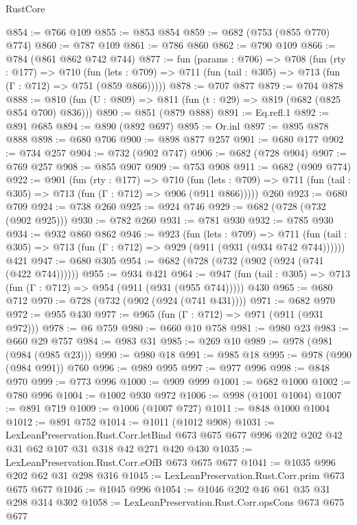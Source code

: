 \begin{lexlean}{RustCore}
\begin{coremodule}
@854 := @766 @109
@855 := @853 @854
@859 := @682 (@753 (@855 @770) @774)
@860 := @787 @109
@861 := @786 @860
@862 := @790 @109
@866 := @784 (@861 @862 @742 @744)
@877 := fun (params : @706) =>
  @708
    (fun (rty : @177) =>
    @710
      (fun (lets : @709) => @711 (fun (tail : @305) => @713 (fun (Γ : @712) => @751 (@859 @866)))))
@878 := @707 @877
@879 := @704 @878
@888 := @810 (fun (U : @809) => @811 (fun (t : @29) => @819 (@682 (@825 @854 @700) @836)))
@890 := @851 (@879 @888)
@891 := Eq.refl.{1}
@892 := @891 @685
@894 := @890 (@892 @697)
@895 := Or.inl
@897 := @895 @878 @888
@898 := @680 @706
@900 := @898 @877 @257
@901 := @680 @177
@902 := @734 @257
@904 := @732 (@902 @747)
@906 := @682 (@728 @904)
@907 := @769 @257
@908 := @855 @907
@909 := @753 @908
@911 := @682 (@909 @774)
@922 := @901
    (fun (rty : @177) =>
    @710
      (fun (lets : @709) => @711 (fun (tail : @305) => @713 (fun (Γ : @712) => @906 (@911 @866)))))
    @260
@923 := @680 @709
@924 := @738 @260
@925 := @924 @746
@929 := @682 (@728 (@732 (@902 @925)))
@930 := @782 @260
@931 := @781 @930
@932 := @785 @930
@934 := @932 @860 @862
@946 := @923
    (fun (lets : @709) =>
    @711 (fun (tail : @305) => @713 (fun (Γ : @712) => @929 (@911 (@931 (@934 @742 @744))))))
    @421
@947 := @680 @305
@954 := @682 (@728 (@732 (@902 (@924 (@741 (@422 @744))))))
@955 := @934 @421
@964 := @947 (fun (tail : @305) => @713 (fun (Γ : @712) => @954 (@911 (@931 (@955 @744))))) @430
@965 := @680 @712
@970 := @728 (@732 (@902 (@924 (@741 @431))))
@971 := @682 @970
@972 := @955 @430
@977 := @965 (fun (Γ : @712) => @971 (@911 (@931 @972)))
@978 := @6 @759
@980 := @660 @10 @758
@981 := @980 @23
@983 := @660 @29 @757
@984 := @983 @31
@985 := @269 @10
@989 := @978 (@981 (@984 (@985 @23)))
@990 := @980 @18
@991 := @985 @18
@995 := @978 (@990 (@984 @991)) @760
@996 := @989 @995
@997 := @977 @996
@998 := @848 @970
@999 := @773 @996
@1000 := @909 @999
@1001 := @682 @1000
@1002 := @780 @996
@1004 := @1002 @930 @972
@1006 := @998 (@1001 @1004)
@1007 := @891 @719
@1009 := @1006 (@1007 @727)
@1011 := @848 @1000 @1004
@1012 := @891 @752
@1014 := @1011 (@1012 @908)
@1031 := LexLeanPreservation.Rust.Corr.letBind
    @673
    @675
    @677
    @996
    @202
    @202
    @42
    @31
    @62
    @107
    @31
    @318
    @42
    @271
    @420
    @430
@1035 := LexLeanPreservation.Rust.Corr.eOfB @673 @675 @677
@1041 := @1035 @996 @202 @62 @31 @298 @316
@1045 := LexLeanPreservation.Rust.Corr.prim @673 @675 @677
@1046 := @1045 @996
@1054 := @1046 @202 @46 @61 @35 @31 @298 @314 @302
@1058 := LexLeanPreservation.Rust.Corr.opsCons @673 @675 @677

\end{coremodule}
\end{lexlean}
